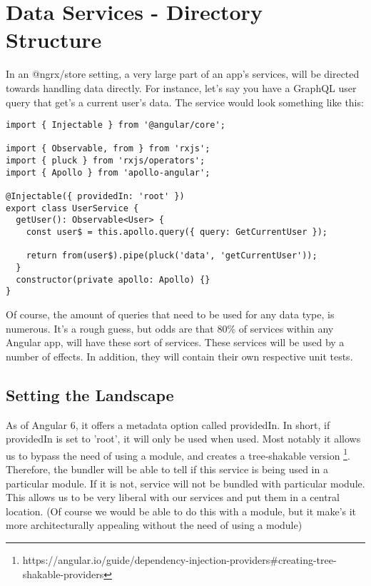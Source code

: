 \maketitle{}
\section{ Data Services - Directory Structure }

In an @ngrx/store setting, a very large part of an app's services, will be
directed towards handling data directly. For instance, let's say you have a
GraphQL user query that get's a current user's data. The service would look
something like this:
\begin{lstlisting}
import { Injectable } from '@angular/core';

import { Observable, from } from 'rxjs';
import { pluck } from 'rxjs/operators';
import { Apollo } from 'apollo-angular';

@Injectable({ providedIn: 'root' })
export class UserService {
  getUser(): Observable<User> {
    const user$ = this.apollo.query({ query: GetCurrentUser });

    return from(user$).pipe(pluck('data', 'getCurrentUser'));
  }
  constructor(private apollo: Apollo) {}
}
\end{lstlisting}

Of course, the amount of queries that need to be used for any data type, is
numerous. It's a rough guess, but odds are that 80\% of services within any
Angular app, will have these sort of services. These services will be used by a
number of effects. In addition, they will contain their own respective unit
tests.

\subsection{ Setting the Landscape }
As of Angular 6, it offers a metadata option called providedIn. In short, if
providedIn is set to 'root', it will only be used when used. Most notably it
allows us to bypass the need of using a module, and creates a tree-shakable
version \footnote{https://angular.io/guide/dependency-injection-providers\#creating-tree-shakable-providers}.
Therefore, the bundler will be able to tell if this service is being used in a
particular module. If it is not, service will not be bundled with particular
module. This allows us to be very liberal with our services and put them in a
central location. (Of course we would be able to do this with a module, but
it make's it more architecturally appealing without the need of using a
module)

